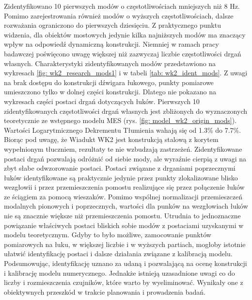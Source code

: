  Zidentyfikowano 10 pierwszych modów o częstotliwościach mniejszych niż 8 Hz. Pomimo zarejestrowania również modów o wyższych częstotliwościach, dalsze rozważania ograniczono do pierwszych dziesięciu. Z praktycznego punktu widzenia, dla obiektów mostowych jedynie kilka najniższych modów ma znaczący wpływ na odpowiedź dynamiczną konstrukcji. Niemniej w ramach pracy badawczej poświęcono uwagę większej niż zazwyczaj liczbie częstotliwości drgań własnych. Charakterystyki zidentyfikowanych modów przedstawiono na wykresach \ref{fig: wk2_research_mods1} i w tabeli \ref{tab: wk2_ident_mods}. Z uwagi na brak dostępu do konstrukcji dźwigara łukowego, punkty pomiarowe umieszczono tylko w dolnej części konstrukcji. Dlatego nie pokazano na wykresach części postaci drgań dotyczących łuków. Pierwszych 10 zidentyfikowanych częstotliwości drgań własnych jest zbliżonych do wyznaczonych teoretycznie ze wstępnego modelu MES (rys. \ref{fig: model_wk2_origin_mods}). Wartości Logarytmicznego Dekrementu Tłumienia wahają się od 1.3\% do 7.7\%. Biorąc pod uwagę, że Wiadukt WK2 jest konstrukcją stalową z korytem wypełnionym tłuczniem, rezultaty te nie wzbudzają zastrzeżeń. Zidentyfikowane postaci drgań pozwalają odróżnić od siebie mody, ale wyraźnie cierpią z uwagi na zbyt słabe odwzorowanie postaci. Postaci związane z drganiami poprzecznymi łuków identyfikowane są praktycznie jedynie przez punkty zlokalizowane blisko wezgłowii i przez przemieszczenia pomostu realizujące się przez połączenie łuków ze ściągiem za pomocą wieszaków. Pomimo wspólnej normalizacji przemieszczeń modalnych pionowych i poprzecznych, wartości dla punków na wezgłowiach łuków nie są znacznie większe niż przemieszczenia pomostu. Utrudnia to jednoznaczne powiązanie właściwych postaci bliskich sobie modów z postaciami uzyskanymi w modelu teoretycznym. Gdyby to było możliwe, zamocowanie punktów pomiarowych na łuku, w większej liczbie i w wyższych partiach, mogłoby istotnie ułatwić identyfikację postaci i dalsze działania związane z kalibracją modelu. Podsumowując, identyfikację uznano za udaną i pozwalającą na ocenę konstrukcji i kalibrację modelu numerycznego. Jednakże istnieją uzasadnione uwagi co do liczby i rozmieszczenia czujników, które warto by wyeliminować. Wynikały one z obiektywnych przeszkód w trakcie planowania i prowadzenia badań.



